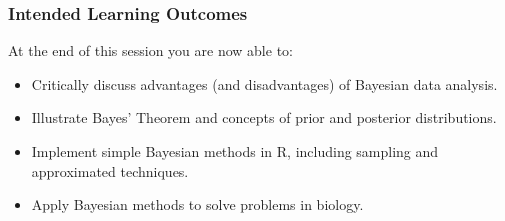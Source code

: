 \documentclass{beamer}
\newcommand{\1}{\ensuremath{\mathbf{1}}}
\begin{document}
%
%
%
\begin{frame}\frametitle{Intended Learning Outcomes}
	At the end of this session you are now able to:
	\begin{itemize}
		\item Critically discuss advantages (and disadvantages) of Bayesian data analysis.
		\item Illustrate Bayes’ Theorem and concepts of prior and posterior distributions.
		\item Implement simple Bayesian methods in R, including sampling and approximated techniques.
		\item Apply Bayesian methods to solve problems in biology.
	\end{itemize}
\end{frame}
%
%
%
\end{document}
